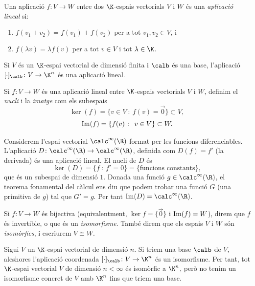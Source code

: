 \begin{definicio}
Una aplicació $f\colon V\to W$ entre dos $\K$-espais vectorials $V$ i $W$ és una \emph{aplicació lineal} si:
\begin{enumerate}
    \item $f(v_1+v_2) = f(v_1) + f(v_2)$ per a tot $v_1,v_2\in V$, i
    \item $f(\lambda v) = \lambda f(v)$ per a tot $v\in V$ i tot $\lambda\in\K$.
\end{enumerate}
\end{definicio}

\begin{exemple}
Si $V$ és un $\K$-espai vectorial de dimensió finita i $\calb$ és una base, l'aplicació $[\cdot]_\calb\colon V\to \K^n$ és una aplicació lineal.
\end{exemple}

\begin{definicio}
Si $f\colon V\to W$ és una aplicació lineal entre $\K$-espais vectorials $V$ i $W$, definim el \emph{nucli} i la \emph{imatge} com els subespais
\[
\ker(f) = \{v\in V~\colon~ f(v)=\vec 0\}\subset V,
\]
\[
\operatorname{Im}(f) = \{f(v)~\colon~ v\in V\}\subset W.
\]
\end{definicio}

\begin{exemple}
\label{exempl:derivada}
Considerem l'espai vectorial $\calc^\infty(\R)$ format per les funcions diferenciables. L'aplicació $D\colon \calc^\infty(\R)\to \calc^\infty(\R)$, definida com $D(f) = f'$ (la derivada) és una aplicació lineal. El nucli de $D$ és
\[
\ker(D)=\{f~\colon~ f'=0\} = \{\text{funcions constants}\},
\]
que és un subespai de dimensió $1$. Donada una funció $g\in\calc^\infty(\R)$, el teorema fonamental del càlcul ens diu que podem trobar una funció $G$ (una primitiva de $g$) tal que $G'=g$. Per tant $\Ima(D)=\calc^\infty(\R)$.
\end{exemple}

Si $f\colon V\to W$ és bijectiva (equivalentment, $\ker f = \{\vec 0\}$ i $\operatorname{Im}(f)=W$), direm que $f$ és invertible, o que és un \emph{isomorfisme}. També direm que els espais $V$ i $W$ són \emph{isomòrfics}, i escriurem $V\cong W$. 
\begin{exemple}
Sigui $V$ un $\K$-espai vectorial de dimensió $n$. Si triem una base $\calb$ de $V$, aleshores l'aplicació coordenada $[\cdot]_\calb\colon V\to\K^n$ és un isomorfisme. Per tant, tot $\K$-espai vectorial $V$ de dimensió $n<\infty$ és isomòrfic a $\K^n$, però no tenim un isomorfisme concret de $V$ amb $\K^n$ fins que triem una base.
\end{exemple}

